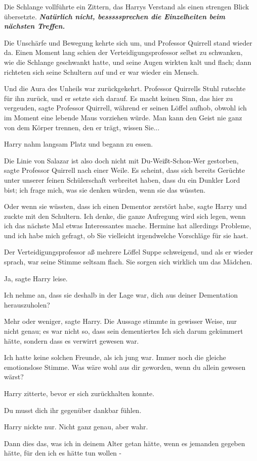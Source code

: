 Die Schlange vollführte ein Zittern, das Harrys Verstand als einen strengen
Blick übersetzte. \glqq{}\textbf{\emph{Natürlich nicht, besssssprechen die
Einzelheiten beim nächsten Treffen.}}\grqq{}

Die Unschärfe und Bewegung kehrte sich um, und Professor Quirrell stand wieder
da. Einen Moment lang schien der Verteidigungsprofessor selbst zu schwanken, wie
die Schlange geschwankt hatte, und seine Augen wirkten kalt und flach; dann
richteten sich seine Schultern auf und er war wieder ein Mensch.

Und die Aura des Unheils war zurückgekehrt. Professor Quirrells Stuhl rutschte
für ihn zurück, und er setzte sich darauf. \glqq{}Es macht keinen Sinn, das hier
zu vergeuden\grqq{}, sagte Professor Quirrell, während er seinen Löffel aufhob,
\glqq{}obwohl ich im Moment eine lebende Maus vorziehen würde. Man kann den Geist
nie ganz von dem Körper trennen, den er trägt, wissen Sie...\grqq{}

Harry nahm langsam Platz und begann zu essen.

\glqq{}Die Linie von Salazar ist also doch nicht mit Du-Weißt-Schon-Wer
gestorben\grqq{}, sagte Professor Quirrell nach einer Weile. \glqq{}Es scheint,
dass sich bereits Gerüchte unter unserer feinen Schülerschaft verbreitet haben,
dass du ein Dunkler Lord bist; ich frage mich, was sie denken würden, wenn sie
das wüssten.\grqq{}

\glqq{}Oder wenn sie wüssten, dass ich einen Dementor zerstört habe\grqq{}, sagte
Harry und zuckte mit den Schultern. \glqq{}Ich denke, die ganze Aufregung wird
sich legen, wenn ich das nächste Mal etwas Interessantes mache. Hermine hat
allerdings Probleme, und ich habe mich gefragt, ob Sie vielleicht irgendwelche
Vorschläge für sie hast.\grqq{}

Der Verteidigungsprofessor aß mehrere Löffel Suppe schweigend, und als er wieder
sprach, war seine Stimme seltsam flach. \glqq{}Sie sorgen sich wirklich um das
Mädchen.\grqq{}

\glqq{}Ja\grqq{}, sagte Harry leise.

\glqq{}Ich nehme an, dass sie deshalb in der Lage war, dich aus deiner
Dementation herauszuholen?\grqq{}

\glqq{}Mehr oder weniger\grqq{}, sagte Harry. Die Aussage stimmte in gewisser
Weise, nur nicht genau; es war nicht so, dass sein dementiertes Ich sich darum
gekümmert hätte, sondern dass es verwirrt gewesen war.

\glqq{}Ich hatte keine solchen Freunde, als ich jung war.\grqq{} Immer noch die gleiche
emotionslose Stimme. \glqq{}Was wäre wohl aus dir geworden, wenn du allein
gewesen wärst?\grqq{}

Harry zitterte, bevor er sich zurückhalten konnte.

\glqq{}Du musst dich ihr gegenüber dankbar fühlen.\grqq{}

Harry nickte nur. Nicht ganz genau, aber wahr.

\glqq{}Dann dies das, was ich in deinem Alter getan hätte, wenn es jemanden
gegeben hätte, für den ich es hätte tun wollen -\grqq{}

